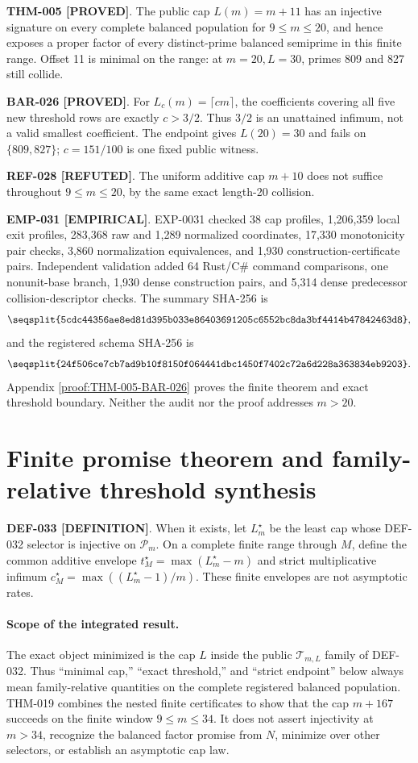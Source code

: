 \documentclass[11pt]{article}
\newcommand{\claimstatus}[2]{\textbf{#1 [#2]}}
\begin{document}
\claimstatus{THM-005}{PROVED}. The public cap \(L(m)=m+11\) has an
injective signature on every complete balanced population for
\(9\le m\le20\), and hence exposes a proper factor of every distinct-prime
balanced semiprime in this finite range. Offset 11 is minimal on the range:
at \(m=20,L=30\), primes 809 and 827 still collide.

\claimstatus{BAR-026}{PROVED}. For \(L_c(m)=\lceil cm\rceil\), the
coefficients covering all five new threshold rows are exactly \(c>3/2\).
Thus \(3/2\) is an unattained infimum, not a valid smallest coefficient.
The endpoint gives \(L(20)=30\) and fails on \(\{809,827\}\);
\(c=151/100\) is one fixed public witness.

\claimstatus{REF-028}{REFUTED}. The uniform additive cap \(m+10\) does not
suffice throughout \(9\le m\le20\), by the same exact length-20 collision.

\claimstatus{EMP-031}{EMPIRICAL}. EXP-0031 checked 38 cap profiles,
1,206,359 local exit profiles, 283,368 raw and 1,289 normalized coordinates,
17,330 monotonicity pair checks, 3,860 normalization equivalences, and 1,930
construction-certificate pairs. Independent validation added 64 Rust/C\#
command comparisons, one nonunit-base branch, 1,930 dense construction pairs,
and 5,314 dense predecessor collision-descriptor checks. The summary
SHA-256 is
\[
\texttt{\seqsplit{5cdc44356ae8ed81d395b033e86403691205c6552bc8da3bf4414b47842463d8}},
\]
and the registered schema SHA-256 is
\[
\texttt{\seqsplit{24f506ce7cb7ad9b10f8150f064441dbc1450f7402c72a6d228a363834eb9203}}.
\]
Appendix \ref{proof:THM-005-BAR-026} proves the finite theorem and exact
threshold boundary. Neither the audit nor the proof addresses \(m>20\).

\section{Finite promise theorem and family-relative threshold synthesis}

\claimstatus{DEF-033}{DEFINITION}. When it exists, let \(L_m^\star\) be the
least cap whose DEF-032 selector is injective on \(\mathcal P_m\). On a
complete finite range through \(M\), define the common additive envelope
\(t_M^\star=\max(L_m^\star-m)\) and strict multiplicative infimum
\(c_M^\star=\max((L_m^\star-1)/m)\). These finite envelopes are not
asymptotic rates.

\paragraph{Scope of the integrated result.}
The exact object minimized is the cap \(L\) inside the public
\(\mathcal T_{m,L}\) family of DEF-032. Thus ``minimal cap,'' ``exact
threshold,'' and ``strict endpoint'' below always mean family-relative
quantities on the complete registered balanced population. THM-019 combines
the nested finite certificates to show that the cap \(m+167\) succeeds on the
finite window \(9\le m\le34\). It does not assert injectivity at \(m>34\),
recognize the balanced factor promise from \(N\), minimize over other
selectors, or establish an asymptotic cap law.
\end{document}
